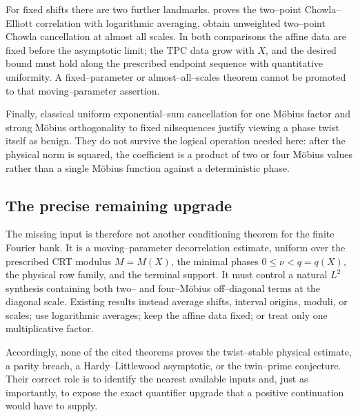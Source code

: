 For fixed shifts there are two further landmarks.  \citet{Tao2016} proves
the two--point Chowla--Elliott correlation with logarithmic averaging.
\citet{TaoTeravainen2019} obtain unweighted two--point Chowla cancellation
at almost all scales.  In both comparisons the affine data are fixed
before the asymptotic limit; the TPC data grow with \(X\), and the desired
bound must hold along the prescribed endpoint sequence with quantitative
uniformity.  A fixed--parameter or almost--all--scales theorem cannot be
promoted to that moving--parameter assertion.

Finally, classical uniform exponential--sum cancellation for one
M\"obius factor \citep{Davenport1937} and strong M\"obius orthogonality to
fixed nilsequences \citep{GreenTao2012} justify viewing a phase twist itself
as benign.  They do not survive the logical operation needed here: after
the physical norm is squared, the coefficient is a product of two or four
M\"obius values rather than a single M\"obius function against a
deterministic phase.

\subsection{The precise remaining upgrade}

The missing input is therefore not another conditioning theorem for the
finite Fourier bank.  It is a moving--parameter decorrelation estimate,
uniform over the prescribed CRT modulus \(M=M(X)\), the minimal phases
\(0\le\nu<q=q(X)\), the physical row family, and the terminal support.  It
must control a natural \(L^2\) synthesis containing both two-- and
four--M\"obius off--diagonal terms at the diagonal scale.  Existing results
instead average shifts, interval origins, moduli, or scales; use
logarithmic averages; keep the affine data fixed; or treat only one
multiplicative factor.

Accordingly, none of the cited theorems proves the twist--stable physical
estimate, a parity breach, a Hardy--Littlewood asymptotic, or the
twin--prime conjecture.  Their correct role is to identify the nearest
available inputs and, just as importantly, to expose the exact quantifier
upgrade that a positive continuation would have to supply.
